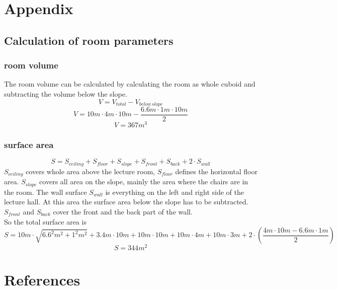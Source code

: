 \documentclass{article}
\begin{document}
\newpage
\section{Appendix}
\subsection{Calculation of room parameters\label{sec:roomparam}}
\subsubsection{room volume}
The room volume can be calculated by calculating the room as whole cuboid and subtracting the volume below the slope.
\begin{equation}
V=V_{total}-V_{below\,slope}
\end{equation}
$$V=10m\cdot 4m\cdot 10m-\frac{6.6m\cdot 1m\cdot 10m}{2}$$
$$V=367m^3$$
\subsubsection{surface area}
\begin{equation}
S=S_{ceiling}+S_{floor}+S_{slope}+S_{front}+S_{back}+2\cdot S_{wall}
\end{equation}
$S_{ceiling}$ covers whole area above the lecture room, $S_{floor}$ defines the horizontal floor area. $S_{slope}$ covers all area on the slope, mainly the area where the chairs are in the room. The wall surface $S_{wall}$ is everything on the left and right side of the lecture hall. At this area the surface area below the slope has to be subtracted. $S_{front}$ and $S_{back}$ cover the front and the back part of the wall.\\
So the total surface area is
$$S=10m\cdot\sqrt{6.6^2m^2+1^2m^2}+3.4m\cdot 10m+10m\cdot 10m+10m\cdot 4m+10m\cdot 3m+2\cdot(\frac{4m\cdot 10m-6.6m\cdot 1m}{2})$$
$$S=344m^2$$
\newpage
\section{References}
\end{document}
